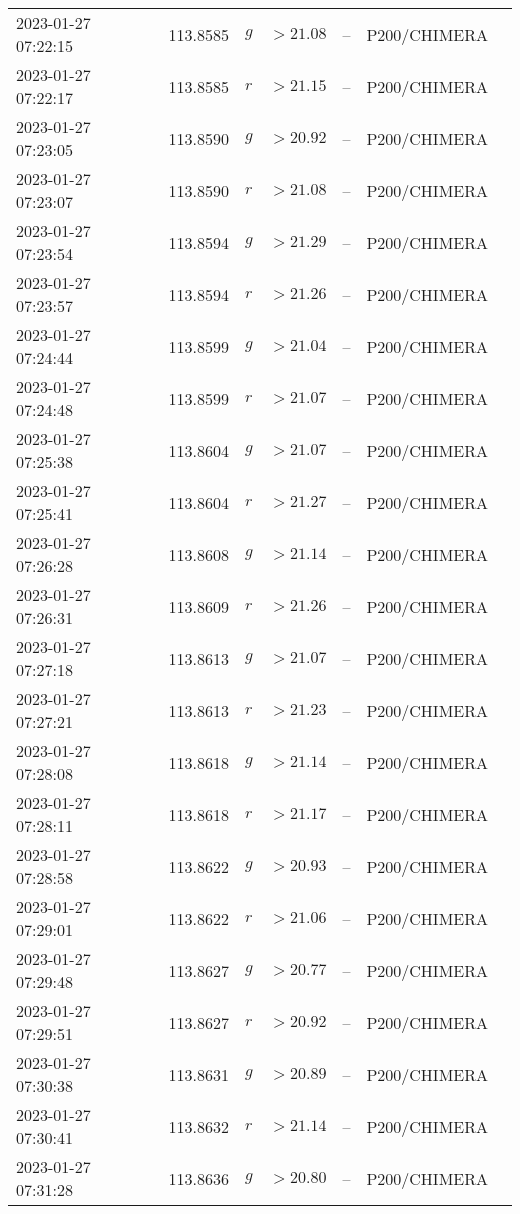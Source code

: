 \documentclass{nature_plusfigure}
\begin{document}
\begin{supplement}
\begin{center}
\begin{longtable}{lllllll}
2023-01-27 07:22:15 & 113.8585 & $g$ & $>21.08$ & -- & P200/CHIMERA &  \\ 
2023-01-27 07:22:17 & 113.8585 & $r$ & $>21.15$ & -- & P200/CHIMERA &  \\ 
2023-01-27 07:23:05 & 113.8590 & $g$ & $>20.92$ & -- & P200/CHIMERA &  \\ 
2023-01-27 07:23:07 & 113.8590 & $r$ & $>21.08$ & -- & P200/CHIMERA &  \\ 
2023-01-27 07:23:54 & 113.8594 & $g$ & $>21.29$ & -- & P200/CHIMERA &  \\ 
2023-01-27 07:23:57 & 113.8594 & $r$ & $>21.26$ & -- & P200/CHIMERA &  \\ 
2023-01-27 07:24:44 & 113.8599 & $g$ & $>21.04$ & -- & P200/CHIMERA &  \\ 
2023-01-27 07:24:48 & 113.8599 & $r$ & $>21.07$ & -- & P200/CHIMERA &  \\ 
2023-01-27 07:25:38 & 113.8604 & $g$ & $>21.07$ & -- & P200/CHIMERA &  \\ 
2023-01-27 07:25:41 & 113.8604 & $r$ & $>21.27$ & -- & P200/CHIMERA &  \\ 
2023-01-27 07:26:28 & 113.8608 & $g$ & $>21.14$ & -- & P200/CHIMERA &  \\ 
2023-01-27 07:26:31 & 113.8609 & $r$ & $>21.26$ & -- & P200/CHIMERA &  \\ 
2023-01-27 07:27:18 & 113.8613 & $g$ & $>21.07$ & -- & P200/CHIMERA &  \\ 
2023-01-27 07:27:21 & 113.8613 & $r$ & $>21.23$ & -- & P200/CHIMERA &  \\ 
2023-01-27 07:28:08 & 113.8618 & $g$ & $>21.14$ & -- & P200/CHIMERA &  \\ 
2023-01-27 07:28:11 & 113.8618 & $r$ & $>21.17$ & -- & P200/CHIMERA &  \\ 
2023-01-27 07:28:58 & 113.8622 & $g$ & $>20.93$ & -- & P200/CHIMERA &  \\ 
2023-01-27 07:29:01 & 113.8622 & $r$ & $>21.06$ & -- & P200/CHIMERA &  \\ 
2023-01-27 07:29:48 & 113.8627 & $g$ & $>20.77$ & -- & P200/CHIMERA &  \\ 
2023-01-27 07:29:51 & 113.8627 & $r$ & $>20.92$ & -- & P200/CHIMERA &  \\ 
2023-01-27 07:30:38 & 113.8631 & $g$ & $>20.89$ & -- & P200/CHIMERA &  \\ 
2023-01-27 07:30:41 & 113.8632 & $r$ & $>21.14$ & -- & P200/CHIMERA &  \\ 
2023-01-27 07:31:28 & 113.8636 & $g$ & $>20.80$ & -- & P200/CHIMERA &  \\ 

\end{longtable}
\end{center}
\end{supplement}
\end{document}
